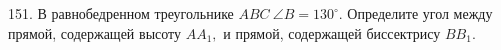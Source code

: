 151. В равнобедренном треугольнике $ABC\ \angle B = 130^\circ.$ Определите угол между прямой, содержащей высоту $AA_1,$ и прямой, содержащей биссектрису $BB_1.$\\
